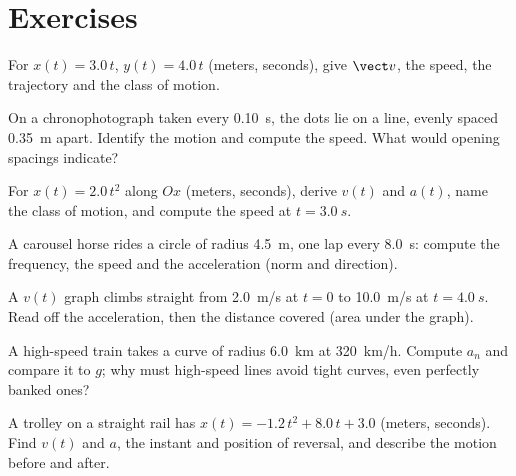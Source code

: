 \section{Exercises}

\begin{exercise}[$\star$]\label{exo:g12:kinematics-2d:1}
For $x(t) = 3.0\,t$, $y(t) = 4.0\,t$ (meters, seconds), give
$\vect v$, the speed, the trajectory and the class of motion.
\end{exercise}

\begin{exercise}[$\star$]\label{exo:g12:kinematics-2d:2}
On a chronophotograph taken every \qty{0.10}{s}, the dots lie on a
line, evenly spaced \qty{0.35}{m} apart. Identify the motion and
compute the speed. What would opening spacings indicate?
\end{exercise}

\begin{exercise}[$\star$]\label{exo:g12:kinematics-2d:3}
For $x(t) = 2.0\,t^2$ along $Ox$ (meters, seconds), derive $v(t)$
and $a(t)$, name the class of motion, and compute the speed at
$t = \qty{3.0}{s}$.
\end{exercise}

\begin{exercise}[$\star$]\label{exo:g12:kinematics-2d:4}
A carousel horse rides a circle of radius \qty{4.5}{m}, one lap every
\qty{8.0}{s}: compute the frequency, the speed and the acceleration
(norm and direction).
\end{exercise}

\begin{exercise}[$\star$]\label{exo:g12:kinematics-2d:5}
A $v(t)$ graph climbs straight from \qty{2.0}{m/s} at $t = 0$ to
\qty{10.0}{m/s} at $t = \qty{4.0}{s}$. Read off the acceleration,
then the distance covered (area under the graph).
\end{exercise}

\begin{exercise}[$\star\star$]\label{exo:g12:kinematics-2d:6}
A high-speed train takes a curve of radius \qty{6.0}{km} at
\qty{320}{km/h}. Compute $a_n$ and compare it to $g$; why must
high-speed lines avoid tight curves, even perfectly banked ones?
\end{exercise}

\begin{exercise}[$\star\star$]\label{exo:g12:kinematics-2d:7}
A trolley on a straight rail has $x(t) = -1.2\,t^2 + 8.0\,t + 3.0$
(meters, seconds). Find $v(t)$ and $a$, the instant and position of
reversal, and describe the motion before and after.
\end{exercise}

